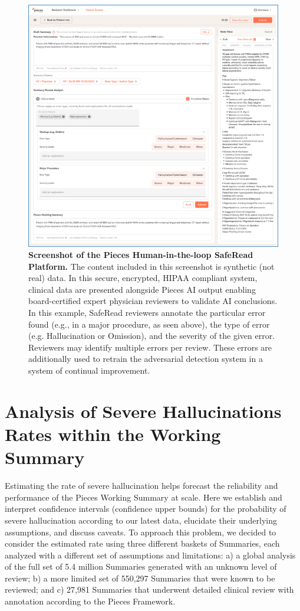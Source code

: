 \documentclass{style/myclass}
\begin{document}
\begin{figure}[t]
\centering
\includegraphics[width=0.7\linewidth]{figure/Picture3.png}
    \caption{\textbf{Screenshot of the Pieces Human-in-the-loop SafeRead Platform.} The content included in this screenshot is synthetic (not real) data. In this secure, encrypted, HIPAA compliant system, clinical data are presented alongside Pieces AI output enabling board-certified expert physician reviewers to validate AI conclusions. In this example, SafeRead reviewers annotate the particular error found (e.g., in a major procedure, as seen above), the type of error (e.g. Hallucination or Omission), and the severity of the given error. Reviewers may identify multiple errors per review. These errors are additionally used to retrain the adversarial detection system in a system of continual improvement.}
    \label{fig:3}
\end{figure}

\section{Analysis of Severe Hallucinations Rates within the Working Summary}

Estimating the rate of severe hallucination helps forecast the reliability and performance of the Pieces Working Summary at scale. Here we establish and interpret confidence intervals (confidence upper bounds) for the probability of severe hallucination according to our latest data, elucidate their underlying assumptions, and discuss caveats. To approach this problem, we decided to consider the estimated rate using three different baskets of Summaries, each analyzed with a different set of assumptions and limitations: a) a global analysis of the full set of 5.4 million Summaries generated with an unknown level of review; b) a more limited set of 550,297 Summaries that were known to be reviewed; and c) 27,981 Summaries that underwent detailed clinical review with annotation according to the Pieces Framework.
\end{document}
